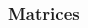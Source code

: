 \copyrightVincent

\begin{frame}[fragile]
    \frametitle{Matrices}
    \begin{columns}
        \begin{column}{0.5\textwidth}

\end{column}
\end{columns}
\end{frame}
